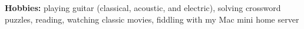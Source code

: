 \documentclass[]{friggeri-mlg-cv} %
\begin{document}
%
%
\textbf{Hobbies:} playing guitar (classical, acoustic, and electric), solving crossword puzzles, reading, watching classic movies, fiddling with my Mac mini home server
\end{document}
